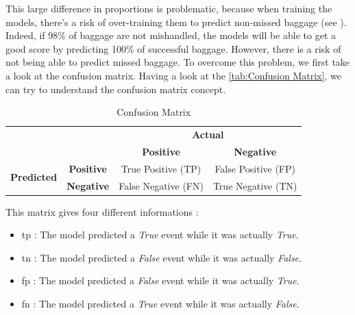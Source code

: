 \documentclass[12pt]{article}
\begin{document}
This large difference in proportions is problematic, because when training the models, there's a risk of over-training them to predict non-missed baggage (see \cite{ArtificialIntelligenceReview}). Indeed, if 98\% of baggage are not mishandled, the models will be able to get a good score by predicting 100\% of successful baggage. However, there is a risk of not being able to predict missed baggage. To overcome this problem, we first take a look at the confusion matrix. Having a look at the \autoref{tab:Confusion Matrix}, we can try to understand the confusion matrix concept. 
\begin{table}[htbp]
    \centering
    \captionsetup{justification=centering}
    \caption{Confusion Matrix}
    \label{tab:Confusion Matrix}
    \newcommand{\cellcolorpos}{\cellcolor{cyan!20}}
    \newcommand{\cellcolorneg}{\cellcolor{yellow!20}}
    \begin{tabular}{cc|c|c|}
        \cline{3-4}
        & & \multicolumn{2}{c|}{\textbf{Actual}} \\
        \cline{3-4}
        & & \textbf{Positive} & \textbf{Negative} \\
        \hline
        \multicolumn{1}{|c|}{\multirow{2}{*}{\textbf{Predicted}}}
        & \textbf{Positive} & \cellcolorpos True Positive (TP) & \cellcolorneg False Positive (FP) \\
        \cline{2-4}
        \multicolumn{1}{|c|}{}
        & \textbf{Negative} & \cellcolorneg False Negative (FN) & \cellcolorpos True Negative (TN) \\
        \hline
    \end{tabular}
\end{table}
\noindent This matrix gives four different informations : 
\begin{itemize}
\centering
    \item \acrshort{tp} : The model predicted a \textit{True} event while it was actually \textit{True}.
    \item \acrshort{tn} : The model predicted a \textit{False} event while it was actually \textit{False}.
    \item \acrshort{fp} : The model predicted a \textit{False} event while it was actually \textit{True}.
    \item \acrshort{fn} : The model predicted a \textit{True} event while it was actually \textit{False}.
\end{itemize}
\end{document}

